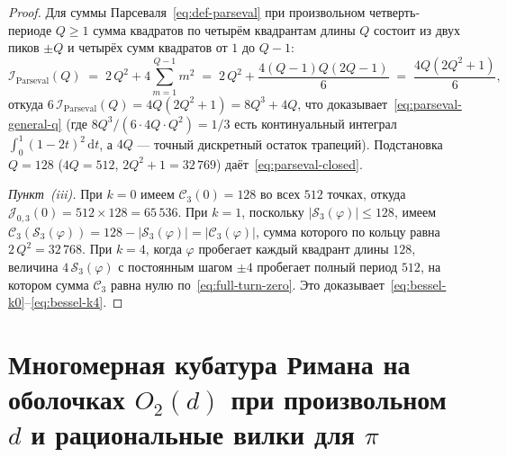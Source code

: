 \documentclass[11pt,a4paper]{article}
\theoremstyle{plain}
\theoremstyle{definition}
\begin{document}
\begin{proof}
Для суммы Парсеваля~\eqref{eq:def-parseval} при произвольном четверть-периоде $Q \ge 1$ сумма квадратов по четырём квадрантам длины $Q$ состоит из двух пиков $\pm Q$ и четырёх сумм квадратов от $1$ до $Q - 1$:
\begin{equation*}
  \mathcal{I}_{\mathrm{Parseval}}(Q) \;=\; 2\,Q^2 + 4\sum_{m=1}^{Q-1} m^2 \;=\; 2\,Q^2 + \frac{4(Q - 1)Q(2Q - 1)}{6} \;=\; \frac{4Q(2Q^2 + 1)}{6},
\end{equation*}
откуда $6\,\mathcal{I}_{\mathrm{Parseval}}(Q) = 4Q(2Q^2 + 1) = 8Q^3 + 4Q$, что доказывает~\eqref{eq:parseval-general-q} (где $8Q^3 / (6\cdot 4Q\cdot Q^2) = 1/3$ есть континуальный интеграл $\int_0^1 (1-2t)^2\,\mathrm{d}t$, а $4Q$ --- точный дискретный остаток трапеций). Подстановка $Q = 128$ ($4Q = 512$, $2Q^2 + 1 = 32\,769$) даёт~\eqref{eq:parseval-closed}.

\emph{Пункт~(iii).} При $k = 0$ имеем $\mathcal{C}_3(0) = 128$ во всех $512$ точках, откуда $\mathcal{J}_{0,3}(0) = 512 \times 128 = 65\,536$. При $k = 1$, поскольку $|\mathcal{S}_3(\varphi)| \le 128$, имеем $\mathcal{C}_3(\mathcal{S}_3(\varphi)) = 128 - |\mathcal{S}_3(\varphi)| = |\mathcal{C}_3(\varphi)|$, сумма которого по кольцу равна $2\,Q^2 = 32\,768$. При $k = 4$, когда $\varphi$ пробегает каждый квадрант длины $128$, величина $4\,\mathcal{S}_3(\varphi)$ с постоянным шагом $\pm 4$ пробегает полный период $512$, на котором сумма $\mathcal{C}_3$ равна нулю по~\eqref{eq:full-turn-zero}. Это доказывает~\eqref{eq:bessel-k0}--\eqref{eq:bessel-k4}.
\end{proof}

\section{Многомерная кубатура Римана на оболочках \texorpdfstring{$O_2(d)$}{O2(d)} при произвольном \texorpdfstring{$d$}{d} и рациональные вилки для \texorpdfstring{$\pi$}{pi}}
\label{sec:continuum-emergence}
\end{document}
